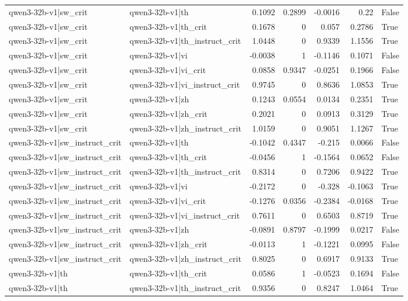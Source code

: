 \begin{table}
\begin{tabular}{l l r r r r l}
qwen3-32b-v1|sw_crit & qwen3-32b-v1|th & 0.1092 & 0.2899 & -0.0016 & 0.22 & False \\
qwen3-32b-v1|sw_crit & qwen3-32b-v1|th_crit & 0.1678 & 0 & 0.057 & 0.2786 & True \\
qwen3-32b-v1|sw_crit & qwen3-32b-v1|th_instruct_crit & 1.0448 & 0 & 0.9339 & 1.1556 & True \\
qwen3-32b-v1|sw_crit & qwen3-32b-v1|vi & -0.0038 & 1 & -0.1146 & 0.1071 & False \\
qwen3-32b-v1|sw_crit & qwen3-32b-v1|vi_crit & 0.0858 & 0.9347 & -0.0251 & 0.1966 & False \\
qwen3-32b-v1|sw_crit & qwen3-32b-v1|vi_instruct_crit & 0.9745 & 0 & 0.8636 & 1.0853 & True \\
qwen3-32b-v1|sw_crit & qwen3-32b-v1|zh & 0.1243 & 0.0554 & 0.0134 & 0.2351 & True \\
qwen3-32b-v1|sw_crit & qwen3-32b-v1|zh_crit & 0.2021 & 0 & 0.0913 & 0.3129 & True \\
qwen3-32b-v1|sw_crit & qwen3-32b-v1|zh_instruct_crit & 1.0159 & 0 & 0.9051 & 1.1267 & True \\
qwen3-32b-v1|sw_instruct_crit & qwen3-32b-v1|th & -0.1042 & 0.4347 & -0.215 & 0.0066 & False \\
qwen3-32b-v1|sw_instruct_crit & qwen3-32b-v1|th_crit & -0.0456 & 1 & -0.1564 & 0.0652 & False \\
qwen3-32b-v1|sw_instruct_crit & qwen3-32b-v1|th_instruct_crit & 0.8314 & 0 & 0.7206 & 0.9422 & True \\
qwen3-32b-v1|sw_instruct_crit & qwen3-32b-v1|vi & -0.2172 & 0 & -0.328 & -0.1063 & True \\
qwen3-32b-v1|sw_instruct_crit & qwen3-32b-v1|vi_crit & -0.1276 & 0.0356 & -0.2384 & -0.0168 & True \\
qwen3-32b-v1|sw_instruct_crit & qwen3-32b-v1|vi_instruct_crit & 0.7611 & 0 & 0.6503 & 0.8719 & True \\
qwen3-32b-v1|sw_instruct_crit & qwen3-32b-v1|zh & -0.0891 & 0.8797 & -0.1999 & 0.0217 & False \\
qwen3-32b-v1|sw_instruct_crit & qwen3-32b-v1|zh_crit & -0.0113 & 1 & -0.1221 & 0.0995 & False \\
qwen3-32b-v1|sw_instruct_crit & qwen3-32b-v1|zh_instruct_crit & 0.8025 & 0 & 0.6917 & 0.9133 & True \\
qwen3-32b-v1|th & qwen3-32b-v1|th_crit & 0.0586 & 1 & -0.0523 & 0.1694 & False \\
qwen3-32b-v1|th & qwen3-32b-v1|th_instruct_crit & 0.9356 & 0 & 0.8247 & 1.0464 & True \\

\end{tabular}
\end{table}
